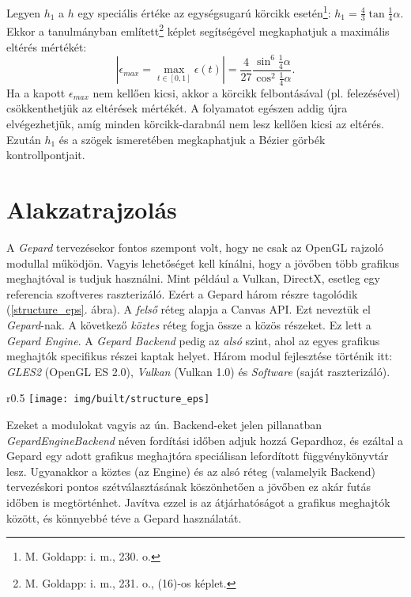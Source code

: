 \documentclass[12pt]{report}
\theoremstyle{definition}
\newcommand{\func}[1]{{\textsl{#1}}}
\newcommand{\melyikoldalra}{r}
\begin{document}
Legyen $h_1$ a $h$ egy speciális értéke az egységsugarú körcikk
esetén\footnote{M. Goldapp: i. m., 230. o.}:
$h_1=\frac{4}{3}\tan{\frac{1}{4}\alpha}$. Ekkor a
\cite[Goldapp]{Goldapp:1991:approximation} tanulmányban említett\footnote{M.
Goldapp: i. m., 231. o., (16)-os képlet.} képlet segítségével megkaphatjuk a
maximális eltérés mértékét: \[|\epsilon_{max}=\max_{{t\in[0, 1]}}\epsilon(t)|=
\frac{4}{27}\frac{\sin^6{\frac{1}{4}\alpha}}{\cos^2{\frac{1}{4}\alpha}}.\] Ha a
kapott $\epsilon_{max}$ nem kellően kicsi, akkor a körcikk felbontásával (pl.
felezésével) csökkenthetjük az eltérések mértékét. A folyamatot egészen addig
újra elvégezhetjük, amíg minden körcikk-darabnál nem lesz kellően kicsi az
eltérés. Ezután $h_1$ és a szögek ismeretében megkaphatjuk a Bézier görbék
kontrollpontjait.



    \chapter{Alakzatrajzolás}

A \emph{Gepard} tervezésekor fontos szempont volt, hogy ne csak az OpenGL
rajzoló modullal működjön. Vagyis lehetőséget kell kínálni, hogy a jövőben több
grafikus meghajtóval is tudjuk használni. Mint például a Vulkan, DirectX,
esetleg egy referencia szoftveres raszterizáló. Ezért a Gepard három részre
tagolódik (\ref{structure_eps}. ábra). A \emph{felső} réteg alapja a Canvas API.
Ezt neveztük el \emph{Gepard}-nak. A következő \emph{köztes} réteg fogja össze a
közös részeket. Ez lett a \emph{Gepard Engine}. A \emph{Gepard Backend} pedig az
\emph{alsó} szint, ahol az egyes grafikus meghajtók specifikus részei kaptak
helyet. Három modul fejlesztése történik itt: \emph{GLES2} (OpenGL ES 2.0),
\emph{Vulkan} (Vulkan 1.0) és \emph{Software} (saját raszterizáló).
  \begin{wrapfigure}{\melyikoldalra}{0.5\textwidth}
    \texttt{[image: img/built/structure\_eps]}
    \caption{\label{structure_eps} A három fő réteg}
  \end{wrapfigure}
Ezeket a modulokat vagyis az ún. Backend-eket jelen pillanatban
\func{GepardEngineBackend} néven fordítási időben adjuk hozzá Gepardhoz, és
ezáltal a Gepard egy adott grafikus meghajtóra speciálisan lefordított
függvénykönyvtár lesz. Ugyanakkor a köztes (az Engine) és az alsó réteg
(valamelyik Backend) tervezéskori pontos szétválasztásának köszönhetően a
jövőben ez akár futás időben is megtörténhet. Javítva ezzel is az átjárhatóságot
a grafikus meghajtók között, és könnyebbé téve a Gepard használatát.
\end{document}
